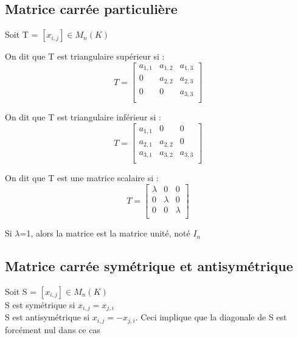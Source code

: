 \subsection{Matrice carrée particulière}
Soit T = $[x_{i,j}] \in M_n(K)$
\begin{de}
 On dit que T est triangulaire supérieur si :
$$T=\begin{bmatrix}
a_{1,1} & a_{1,2} & a_{1,3}  \\
0 & a_{2,2} & a_{2,3} \\
0 & 0 & a_{3,3} \\
\end{bmatrix}$$
\end{de}
\begin{de}
 On dit que T est triangulaire inférieur si :
$$T=\begin{bmatrix}
a_{1,1} & 0 & 0  \\
a_{2,1} & a_{2,2} & 0 \\
a_{3,1} & a_{3,2} & a_{3,3} \\
\end{bmatrix}$$
\end{de}
\begin{de}
 On dit que T est une matrice scalaire si :
$$T=\begin{bmatrix}
\lambda & 0 & 0  \\
0 & \lambda & 0 \\
0 & 0 &\lambda \\
\end{bmatrix}$$
\end{de}
Si $\lambda$=1, alors la matrice est la matrice unité, noté $I_{n}$
\subsection{Matrice carrée symétrique et antisymétrique}
\begin{de}
Soit S = $[x_{i,j}] \in M_n(K)$ \\
S est symétrique si $x_{i,j}=x_{j,i}$\\
S est antisymétrique si $x_{i,j}=-x_{j,i}$. Ceci implique que la diagonale de S est forcément nul dans ce cas
\end{de}
